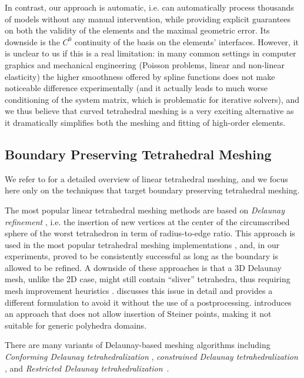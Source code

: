 In contrast, our approach is automatic, i.e. can automatically process thousands of models without any manual intervention, while providing explicit guarantees on both the validity of the elements and the maximal geometric error. Its downside is the $C^0$ continuity of the basis on the elements' interfaces. However, it is unclear to us if this is a real limitation: in many common settings in computer graphics and mechanical engineering (Poisson problems, linear and non-linear elasticity) the higher smoothness offered by spline functions does not make noticeable difference experimentally \cite{schneider2019large} (and it actually leads to much worse conditioning of the system matrix, which is problematic for iterative solvers), and we thus believe that curved tetrahedral meshing is a very exciting alternative as it dramatically simplifies both the meshing and fitting of high-order elements.

\subsection{Boundary Preserving Tetrahedral Meshing}
\label{cumin:sec:rel:linear}

We refer to \cite{hu2018tetrahedral} for a detailed overview of linear tetrahedral meshing, and we focus here only on the techniques that target boundary preserving tetrahedral meshing. 

The most popular linear tetrahedral meshing methods are based on {\em Delaunay refinement}
\cite{chew1993guaranteed,shewchuk1998tetrahedral,ruppert1995delaunay}, i.e. the insertion of new vertices at the center of the circumscribed sphere of the worst
tetrahedron in term of radius-to-edge ratio. This approach is used in the most popular tetrahedral meshing implementations  \cite{tetgen,jamin2015cgalmesh}, and, in
our experiments, proved to be consistently successful as long as the boundary is allowed to be refined. A downside of these approaches is that a 3D Delaunay mesh, unlike the 2D case, might still contain ``sliver'' tetrahedra, thus requiring mesh improvement
heuristics \cite{cheng2000silver,du2003tetrahedral,alliez2005variational,tournois2009interleaving}. \cite{Alexa:2019} discusses this issue in detail and provides a different formulation to avoid it without the use of a postprocessing. 
%
\cite{alexa2020conforming} introduces an approach that does not allow insertion of Steiner points, making it not suitable for generic polyhedra domains.

There are many variants of {Delaunay-based} meshing algorithms including 
{\em Conforming Delaunay tetrahedralization}
\cite{murphy2001point,CohenSteiner:2002:CDT}, {\em constrained Delaunay tetrahedralization}
\cite{chew1989constrained,si2005meshing,shewchuk2002constrained,Si:2014:ICA}, and {\em Restricted Delaunay tetrahedralization}\ \cite{cheng2008practical,boissonnat2005provably,Engwirda16}.

